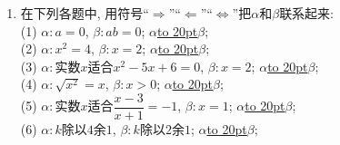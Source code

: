 \documentclass[10pt,a4paper]{article}
\newcommand{\blank}[1]{\underline{\hbox to #1pt{}}}
\begin{document}
\begin{enumerate}[1.]
(4) $\{1\}$是$\{0, 1, 2\}$的真子集;\blank{50};\\
(5) $1$是$\{0, 1, 2\}$的真子集;\blank{50};\\
(6) 若$x<-2$或$x>2$, 则$x^2>1$;\blank{50};\\
(7) 如果$|a|<2$, 那么$a<2$;\blank{50};\\
(8) 对任意实数$a,b$, 方程$(a+1)x+b=0$的解为$x=-\dfrac b{a+1}$;\blank{50};\\
(9) 若命题$\alpha$、$\beta$、$\gamma$满足$\alpha\Rightarrow \beta$, $\beta\Rightarrow \gamma$, $\gamma\Rightarrow \alpha$, 则$\alpha\Leftrightarrow \gamma$;\blank{50};\\
(10) 若关于$x$的方程$ax^2+bx+c=0$($a\ne 0$)的两实数根之积是正数, 则$ac>0$;\blank{50};\\
(11) 若某个整数不是偶数, 则这个数不能被$4$整除;\blank{50};\\
(12) 合数一定是偶数;\blank{50};\\
(13) 所有的偶数都是素数或合数;\blank{50};\\
(14) 所有的偶数都是素数或所有的偶数都是合数;\blank{50};\\
(15) 如果$A\subset B$, $B\supset C$, 那么$A=C$;\blank{50};\\
(16) 空集是任何集合的真子集;\blank{50};\\
(17) 若$x\in \mathbf{R}$, 则方程$x^2-x+1=0$不成立;\blank{50};\\
(18) 若$A\cap B\ne \varnothing$, $B\subset C$, 则$A\cap C\ne \varnothing$;\blank{50};\\
(19) 存在一个三角形, 它的任意两边的平方和小于第三边的平方;\blank{50};\\
(20) 对于任意一个三角形, 存在一组两边的平方和不等于第三边的平方;\blank{50}.
\item 在下列各题中, 用符号``$\Rightarrow$''``$\Leftarrow$''``$\Leftrightarrow$''把$\alpha$和$\beta$联系起来:\\
(1) $\alpha:a=0$, $\beta:ab=0$; $\alpha$\blank{20}$\beta$;\\
(2) $\alpha:x^2=4$, $\beta:x=2$; $\alpha$\blank{20}$\beta$;\\
(3) $\alpha:$实数$x$适合$x^2-5x+6=0$, $\beta:x=2$; $\alpha$\blank{20}$\beta$;\\
(4) $\alpha:\sqrt {x^2}=x$, $\beta:x>0$; $\alpha$\blank{20}$\beta$;\\
(5) $\alpha:$实数$x$适合$\dfrac{x-3}{x+1}=-1$, $\beta:x=1$; $\alpha$\blank{20}$\beta$;\\
(6) $\alpha:k$除以$4$余$1$, $\beta:k$除以$2$余$1$; $\alpha$\blank{20}$\beta$;\\

\end{enumerate}
\end{document}
